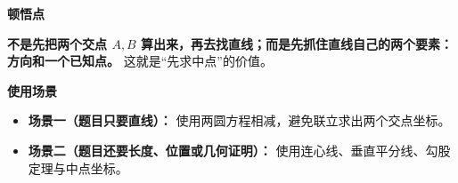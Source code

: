 \begin{explanationbox}
	\medskip
	\textbf{\textcolor{CExplanation}{顿悟点}}

	\textbf{不是先把两个交点 $A,B$ 算出来，再去找直线；而是先抓住直线自己的两个要素：方向和一个已知点。} 这就是“先求中点”的价值。

	\medskip
	\textbf{\textcolor{CExplanation}{使用场景}}
	\begin{itemize}[leftmargin=*, itemsep=0.5em, topsep=0.4em]
		\item \textbf{场景一（题目只要直线）：} 使用两圆方程相减，避免联立求出两个交点坐标。
		\item \textbf{场景二（题目还要长度、位置或几何证明）：} 使用连心线、垂直平分线、勾股定理与中点坐标。
	\end{itemize}
\end{explanationbox}
